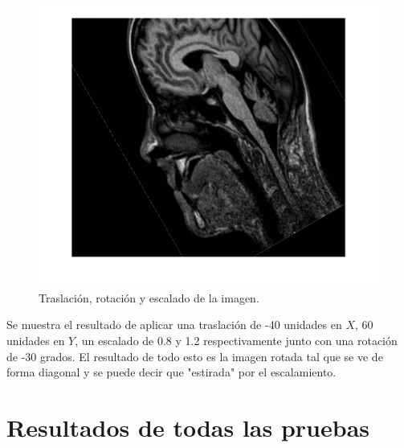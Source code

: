 \documentclass[11pt, letterpaper]{article}
\begin{document}
\begin{figure}[h!]
	\centering
	\begin{minipage}{0.8\textwidth}
		\centering
		\includegraphics[width=\textwidth]{IMG/R4.jpg}
		\caption{Traslación, rotación y escalado de la imagen.}
		\label{fig:f10}
	\end{minipage}\hfill
\end{figure}

Se muestra el resultado de aplicar una traslación de -40 unidades en $X$, 60 unidades en $Y$, un escalado de 0.8 y 1.2 respectivamente junto con una rotación de -30 grados. El resultado de todo esto es la imagen rotada tal que se ve de forma diagonal y se puede decir que "estirada" por el escalamiento.

\newpage

\section{Resultados de todas las pruebas}
\end{document}
